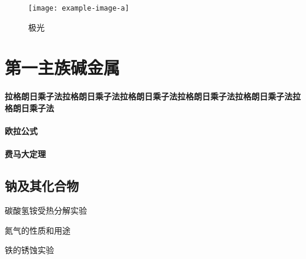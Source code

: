 \documentclass[color=BLUE]{textbook-cn}%
\begin{document}
\lipsum
\begin{figure}[htbp]
\centering\texttt{[image: example-image-a]}
\caption{极光}
\end{figure}




\chapter{第一主族\quad 碱金属}


\subsubsection*{拉格朗日乘子法拉格朗日乘子法拉格朗日乘子法拉格朗日乘子法拉格朗日乘子法拉格朗日乘子法}
\lipsum[1-3]

\subsubsection*{欧拉公式}
\lipsum[1-2]

\subsubsection*{费马大定理}
\lipsum[2-3]



\section{钠及其化合物}

\begin{Point}
\lipsum[2]
\end{Point}

\begin{Case}
\item 碳酸氢铵受热分解实验
\item 氮气的性质和用途
\item 铁的锈蚀实验
\end{Case}
\end{document}
